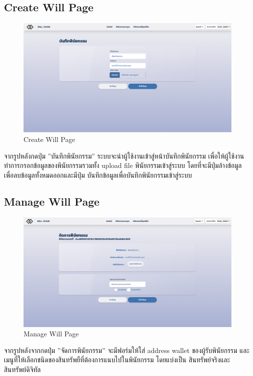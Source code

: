 \documentclass[12pt,oneside,openright,a4paper]{cpe-thai-project}
\begin{document}
\clearpage
\subsection{Create Will Page }
	\begin{figure}[!thb]
			\centering
			\includegraphics[scale=0.2]{mintWill4}
			\caption{Create Will Page}
		\end{figure}
		\FloatBarrier
\tab จากรูปหลังกดปุ่ม ''บันทึกพินัยกรรม'' ระบบจะนำผู้ใช้งานเข้าสู่หน้าบันทึกพินัยกรรม เพื่อให้ผู้ใช้งานทำการกรอกข้อมูลของพินัยกรรมรวมทั้ง upload file พินัยกรรมเข้าสู่ระบบ โดยที่จะมีปุ่มล้างข้อมูลเพื่อลบข้อมูลทั้งหมดออกและมีปุ่ม บันทึกข้อมูลเพื่อบันทึกพินัยกรรมเข้าสู่ระบบ

\subsection{Manage Will Page}
	\begin{figure}[!thb]
			\centering
			\includegraphics[scale=0.2]{manageWill4}
			\caption{Manage Will Page}
		\end{figure}
		\FloatBarrier
\tab จากรูปหลังจากกดปุ่ม ''จัดการพินัยกรรม'' จะมีฟอร์มให้ใส่ address wallet ของผู้รับพินัยกรรม และ เมนูที่ให้เลือกชนิดของสินทรัพยืที่ต้องการแนบไปในพินัยกรรม โดยแบ่งเป็น สินทรัพย์จริงและสินทรัพย์ดิจิทัล 
\end{document}
